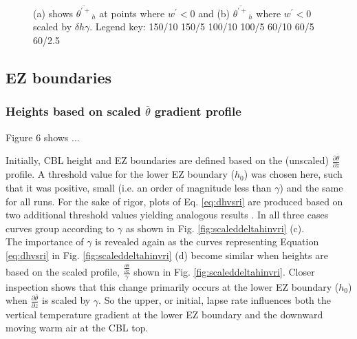 \documentclass[referee]{svjour3}
\begin{document}
\begin{figure}[htbp]
\begin{minipage}[b]{0.5\linewidth}
        \end{minipage}
        \caption[Downward moving positive potential temperature fluctuations at $h$]{(a) shows $\overline{\theta^{\prime+}}_{h}$ at points where $w^{\prime}<0$ and (b) $\overline{\theta^{\prime+}}_{h}$ where $w^{\prime}<0$ scaled by $\delta h \gamma$.  Legend key:{\color{red} } 150/10  150/5 \hspace{2mm} {\color{black} } 100/10 \hspace{2mm} {\color{black} } 100/5 \hspace{2mm} {\color{offyellow} } 60/10 \hspace{2mm} {\color{offyellow} } 60/5 \hspace{2mm} {\color{offyellow} } 60/2.5}
        \label{fig:downwarm_theta}
\end{figure}
\clearpage

\subsection{EZ boundaries}


\subsubsection{Heights based on scaled $\overline{\theta}$ gradient profile}

Figure 6 shows ...

Initially, CBL height and EZ boundaries are defined based on the (unscaled) $\frac{\partial \overline{\theta}}{\partial z}$ profile. A threshold value for the lower EZ boundary ($h_{0}$) was chosen here, such that it was positive, small (i.e. an order of magnitude less than $\gamma$) and the same for all runs.  For the sake of rigor, plots of Eq. \ref{eq:dhvsri} are produced based on two additional threshold values yielding analogous results \citep{Nchap14}.  In all three cases curves group according to $\gamma$ as shown in Fig. \ref{fig:scaleddeltahinvri} (c).\\

The importance of $\gamma$ is revealed again as the curves representing Equation \ref{eq:dhvsri} in Fig. \ref{fig:scaleddeltahinvri} (d) become similar when heights are based on the scaled profile, $\frac{\frac{\partial \overline{\theta}}{\partial z}}{\gamma}$ shown in Fig. \ref{fig:scaleddeltahinvri}. Closer inspection shows that this change primarily occurs at the lower EZ boundary ($h_{0}$) when $\frac{\partial \overline{\theta}}{\partial z}$ is scaled by $\gamma$. So the upper, or initial, lapse rate influences both the vertical temperature gradient at the lower EZ boundary and the downward moving warm air at the CBL top.\\
\end{document}
